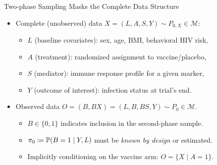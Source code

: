 \documentclass{beamer}
\begin{document}



\begin{frame}[c]{Two-phase Sampling Masks the Complete Data Structure}

\begin{center}
\begin{itemize}
  \itemsep8pt
  \item Complete (unobserved) data $X = (L, A, S, Y) \sim P_{0,X} \in
    \mathcal{M}$:
    \begin{itemize}
      \itemsep4pt
      \item $L$ (baseline covariates): sex, age, BMI, behavioral HIV risk,
      \item $A$ (treatment): randomized assignment to vaccine/placebo,
      \item $S$ (mediator): immune response profile for a given marker,
      \item $Y$ (outcome of interest): infection status at trial's end.
    \end{itemize}
  \item Observed data $O = (B, BX) = (L, B, BS, Y) \sim P_0 \in \mathcal{M}$.
    \begin{itemize}
      \itemsep4pt
      \item $B \in \{0,1\}$ indicates inclusion in the second-phase sample.
      \item $\pi_0 \coloneqq \mathbb{P}(B = 1 \mid Y, L)$ must be \textit{known by
        design} or estimated.
      \item Implicitly conditioning on the vaccine arm: $O = \{X \mid A = 1\}$.
    \end{itemize}
\end{itemize}
\end{center}


\end{frame}

\end{document}
